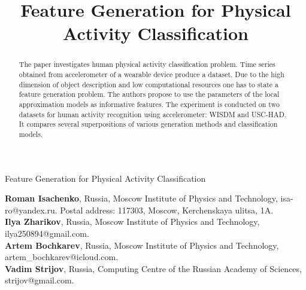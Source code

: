\documentclass{llncs}
\begin{document}
\begin{titlepage}
\begin{center}
		\LARGE Feature Generation for Physical Activity Classification\\
		\bigskip
		\bigskip
\end{center}
\large \textbf{Roman Isachenko}, Russia, Moscow Institute of Physics and Technology, isa-ro@yandex.ru. Postal address: 117303, Moscow, Kerchenskaya ulitsa, 1A.\\
\large \textbf{Ilya Zharikov}, Russia, Moscow Institute of Physics and Technology, ilya250894@gmail.com.\\
\large \textbf{Artem Bochkarev}, Russia, Moscow Institute of Physics and Technology, artem\_bochkarev@icloud.com.\\
\large \textbf{Vadim Strijov}, Russia, Computing Centre of the Russian Academy of Sciences, strijov@gmail.com.\\
\end{titlepage}


\title{Feature Generation for Physical Activity Classification}
%
%
\author{}
%
%
%
\institute{}

\maketitle              %

\begin{abstract}
	The paper investigates human physical activity classification problem.
	Time series obtained from accelerometer of a wearable device produce a dataset.
	Due to the high dimension of object description and low computational resources one has to state a feature generation problem.
	The authors propose to use the parameters of the local approximation models as informative features. 
	The experiment is conducted on two datasets for human activity recognition using accelerometer: WISDM and USC-HAD. 
	It compares several superpositions of various generation methods and classification models.
\end{abstract}
\end{document}
